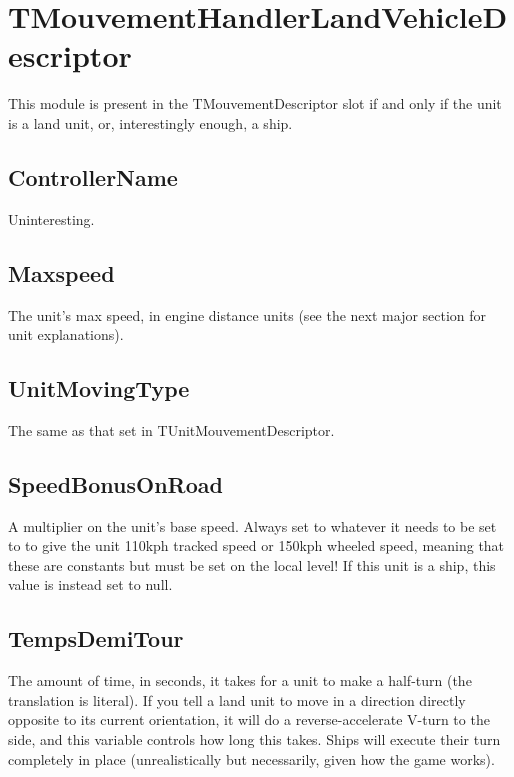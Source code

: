 \documentclass{article}
\begin{document}
\section{TMouvementHandlerLandVehicleDescriptor}

This module is present in the TMouvementDescriptor slot if and only if the unit is a land unit, or, interestingly enough, a ship.

\subsection{ControllerName}

Uninteresting.

\subsection{Maxspeed}

The unit's max speed, in engine distance units (see the next major section for unit explanations).

\subsection{UnitMovingType}

The same as that set in TUnitMouvementDescriptor.

\subsection{SpeedBonusOnRoad}

A multiplier on the unit's base speed. Always set to whatever it needs to be set to to give the unit 110kph tracked speed or 150kph wheeled speed, meaning that these are constants but must be set on the local level! If this unit is a ship, this value is instead set to null.

\subsection{TempsDemiTour}

The amount of time, in seconds, it takes for a unit to make a half-turn (the translation is literal). If you tell a land unit to move in a direction directly opposite to its current orientation, it will do a reverse-accelerate V-turn to the side, and this variable controls how long this takes. Ships will execute their turn completely in place (unrealistically but necessarily, given how the game works).
\end{document}
